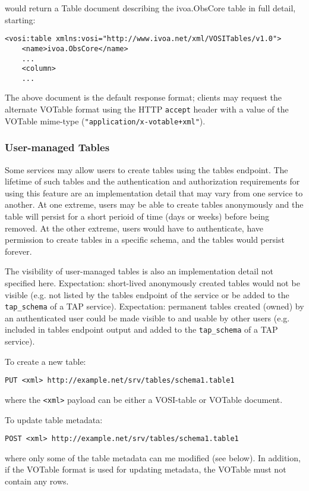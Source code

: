 \documentclass[11pt,letter]{ivoa}
\begin{document}
would return a Table document describing the ivoa.ObsCore table in full
detail, starting:

\begin{verbatim}
<vosi:table xmlns:vosi="http://www.ivoa.net/xml/VOSITables/v1.0">
    <name>ivoa.ObsCore</name>
    ...
    <column>
    ...
\end{verbatim}

The above  document is the default response format; clients 
may request the alternate VOTable format using the HTTP \verb|accept| header with a
value of the VOTable mime-type (\verb|"application/x-votable+xml"|).

\subsubsection{User-managed Tables}
Some services may allow users to create tables using the tables endpoint. The lifetime
of such tables and the authentication and authorization requirements for using this feature
are an implementation detail that may vary from one service to another. At one extreme,
users may be able to create tables anonymously and the table will persist for a short 
perioid of time (days or weeks) before being removed. At the other extreme, users would
have to authenticate, have permission to create tables in a specific schema, and the tables
would persist forever.

The visibility of user-managed tables is also an implementation detail not specified here.
Expectation: short-lived anonymously created tables would not be visible (e.g. not listed 
by the tables endpoint of the service or be added to the \verb|tap_schema| of a TAP service).
Expectation: permanent tables created (owned) by an authenticated user could be made
visible to and usable by other users (e.g. included in tables endpoint output and added to
the \verb|tap_schema| of a TAP service).

To create a new table:
\begin{verbatim}
PUT <xml> http://example.net/srv/tables/schema1.table1
\end{verbatim}
\noindent where the \verb|<xml>| payload can be either a VOSI-table or VOTable document.

To update table metadata:
\begin{verbatim}
POST <xml> http://example.net/srv/tables/schema1.table1
\end{verbatim}
\noindent where only some of the table metadata can me modified (see below). In addition, if
the VOTable format is used for updating metadata, the VOTable must not contain any rows.
\end{document}
